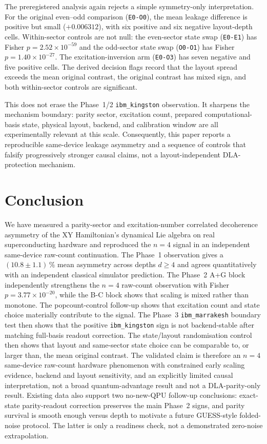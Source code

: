 \documentclass[reprint,aps,physrev,superscriptaddress,floatfix,longbibliography]{revtex4-2}
\begin{document}
The preregistered analysis again rejects a simple symmetry-only
interpretation. For the original even--odd comparison
(\texttt{E0-O0}), the mean leakage difference is positive but small
($+0.006312$), with six positive and six negative layout-depth cells.
Within-sector controls are not null: the even-sector state swap
(\texttt{E0-E1}) has Fisher $p=2.52\times10^{-59}$ and the odd-sector
state swap (\texttt{O0-O1}) has Fisher $p=1.40\times10^{-27}$. The
excitation-inversion arm (\texttt{E0-O3}) has seven negative and five
positive cells. The derived decision flags record that the layout
spread exceeds the mean original contrast, the original contrast has
mixed sign, and both within-sector controls are significant.

This does not erase the Phase~1/2 \texttt{ibm\_kingston} observation.
It sharpens the mechanism boundary: parity sector, excitation count,
prepared computational-basis state, physical layout, backend, and
calibration window are all experimentally relevant at this scale.
Consequently, this paper reports a reproducible same-device leakage
asymmetry and a sequence of controls that falsify progressively
stronger causal claims, not a layout-independent DLA-protection
mechanism.

\section{Conclusion}

We have measured a parity-sector and excitation-number correlated
decoherence asymmetry of the XY Hamiltonian's dynamical Lie algebra
on real superconducting hardware and reproduced the $n=4$ signal in
an independent same-device raw-count continuation. The Phase~1
observation gives a
$(10.8 \pm 1.1)\,\%$ mean asymmetry across depths $d \ge 4$ and agrees
quantitatively with an independent classical simulator prediction.
The Phase~2 A+G block independently strengthens the $n=4$ raw-count
observation with Fisher $p=3.77\times10^{-20}$, while the B-C block
shows that scaling is mixed rather than monotone. The popcount-control
follow-up shows that excitation count and state choice materially
contribute to the signal. The Phase~3 \texttt{ibm\_marrakesh}
boundary test then shows that the positive \texttt{ibm\_kingston}
sign is not backend-stable after matching full-basis readout
correction. The state/layout randomisation control then shows that
layout and same-sector state choice can be comparable to, or larger
than, the mean original contrast. The validated claim is therefore an
$n=4$ same-device raw-count hardware phenomenon with constrained early
scaling evidence, backend and layout sensitivity, and an explicitly
limited causal interpretation, not a broad quantum-advantage result
and not a DLA-parity-only result.
Existing data also support two no-new-QPU follow-up conclusions:
exact-state parity-readout correction preserves the main Phase~2
signs, and parity survival is smooth enough versus depth to motivate
a future GUESS-style folded-noise protocol. The latter is only a
readiness check, not a demonstrated zero-noise extrapolation.
\end{document}
